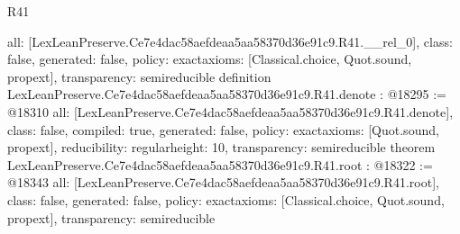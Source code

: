\begin{lexlean}{R41}
\begin{coremodule}
{  all: [LexLeanPreserve.Ce7e4dac58aefdeaa5aa58370d36e91c9.R41.__rel_0],
  class: false,
  generated: false,
  policy: exact{axioms: [Classical.choice, Quot.sound, propext]},
  transparency: semireducible
}
definition LexLeanPreserve.Ce7e4dac58aefdeaa5aa58370d36e91c9.R41.denote : @18295 := @18310 {
  all: [LexLeanPreserve.Ce7e4dac58aefdeaa5aa58370d36e91c9.R41.denote],
  class: false,
  compiled: true,
  generated: false,
  policy: exact{axioms: [Quot.sound, propext]},
  reducibility: regular{height: 10},
  transparency: semireducible
}
theorem LexLeanPreserve.Ce7e4dac58aefdeaa5aa58370d36e91c9.R41.root : @18322 := @18343 {
  all: [LexLeanPreserve.Ce7e4dac58aefdeaa5aa58370d36e91c9.R41.root],
  class: false,
  generated: false,
  policy: exact{axioms: [Classical.choice, Quot.sound, propext]},
  transparency: semireducible
}


\end{coremodule}
\end{lexlean}
